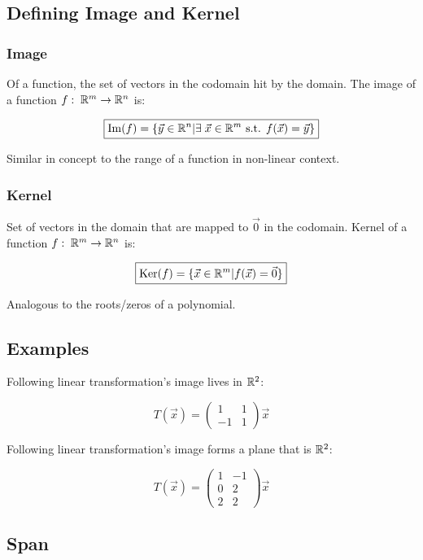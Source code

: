 \subsection{Defining Image and Kernel}

\subsubsection{Image}

Of a function, the set of vectors in the codomain hit by the domain.
The image of a function $f:\;\mathbb{R}^m\rightarrow \mathbb{R}^n$ is:

\[\boxed{
    \mathrm{Im}(f)=\{\vec{y}\in \mathbb{R}^n | \exists\;\vec{x}\in \mathbb{R}^m\text{ s.t. }f(\vec{x})=\vec{y}\}
}\]

Similar in concept to the range of a function in non-linear context.

\subsubsection{Kernel}

Set of vectors in the domain that are mapped to $\vec{0}$ in the codomain.
Kernel of a function $f:\;\mathbb{R}^m\rightarrow \mathbb{R}^n$ is:

\[\boxed{
    \mathrm{Ker}(f)=\{\vec{x}\in \mathbb{R}^m | f(\vec{x})=\vec{0}\}
}\]

Analogous to the roots/zeros of a polynomial.

\subsection{Examples}

Following linear transformation's image lives in $\mathbb{R}^2$:

\[T(\vec{x})=\left(\begin{array}{cc}
    1 & 1 \\
    -1 & 1
    \end{array}\right) \vec{x}\]

Following linear transformation's image forms a plane that is
$\mathbb{R}^2$:

\[T(\vec{x})=\left(\begin{array}{cc}
    1 & -1 \\
    0 & 2 \\
    2 & 2
    \end{array}\right) \vec{x}\]

\subsection{Span}

